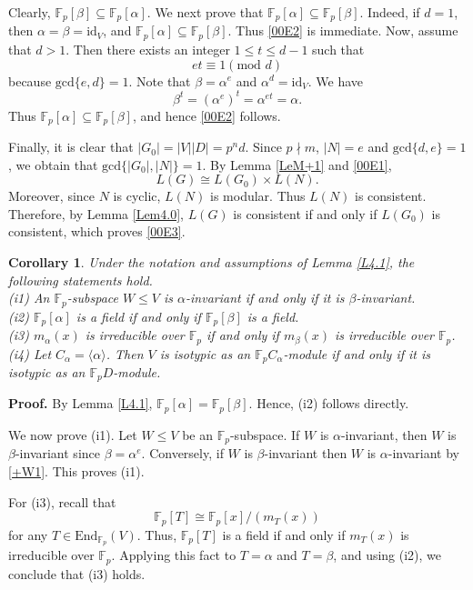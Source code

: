 \documentclass[12pt]{article}
\newtheorem{corollary}{\bf Corollary}[section]
\def\QEDopen{{\setlength{\fboxsep}{0pt}\setlength{\fboxrule}{0.2pt}\fbox{\rule[0pt]{0pt}{1.3ex}\rule[0pt]{1.3ex}{0pt}}}}
\def\QED{\QEDopen}
\def\proof{{\bf Proof.} }
\def\endproof{\hspace*{\fill}~\QED\par\endtrivlist\unskip}
\begin{document}
Clearly, $\mathbb{F}_p[\beta]\subseteq\mathbb{F}_p[\alpha]$. 
We next prove that $\mathbb{F}_p[\alpha]\subseteq\mathbb{F}_p[\beta]$. Indeed, if $d=1$, then $\alpha=\beta=\mbox{id}_V$, 
and $\mathbb{F}_p[\alpha]\subseteq\mathbb{F}_p[\beta]$. Thus \eqref{00E2} is immediate. Now, assume that $d>1$.
Then there exists an integer $1\leq t\leq d-1$ such that $$et\equiv 1 (\mbox{mod }d)$$ because $\mbox{gcd}\{e,d\}=1$. Note that $\beta=\alpha^e$ and $\alpha^d=\mbox{id}_V$. We have 
\begin{equation}\label{+W1}
\beta^t=(\alpha^{e})^t=\alpha^{et}=\alpha.    
\end{equation} 
Thus $\mathbb{F}_p[\alpha]\subseteq\mathbb{F}_p[\beta]$, and hence \eqref{00E2} follows.

Finally, it is clear that $|G_0|=|V||D|=p^nd$. Since $p\nmid m$, $|N|=e$ and $\mbox{gcd}\{d,e\}=1$, we obtain that $\mbox{gcd}\{|G_0|, |N|\}=1$. By Lemma \ref{LeM+1} and \eqref{00E1}, $$L(G)\cong L(G_0)\times L(N).$$ 
Moreover, since $N$ is cyclic, $L(N)$ is modular. Thus $L(N)$ is consistent. Therefore, by Lemma \ref{Lem4.0}, $L(G)$ is consistent if and only if $L(G_0)$ is consistent, which proves \eqref{00E3}.
\endproof 


\begin{corollary}\label{Corr4.1}
Under the notation and assumptions of Lemma \ref{L4.1}, the following statements hold.\\
(i1) An $\mathbb{F}_p$-subspace $W\leq V$ is $\alpha$-invariant if and only if it is $\beta$-invariant.\\
(i2) $\mathbb{F}_p[\alpha]$ is a field if and only if $\mathbb{F}_p[\beta]$ is a field.\\
(i3) $m_{\alpha}(x)$ is irreducible over $\mathbb{F}_p$
if and only if $m_{\beta}(x)$ is irreducible over $\mathbb{F}_p$.\\
(i4) Let $C_\alpha=\langle\alpha\rangle$. Then $V$ is
isotypic as an $\mathbb{F}_pC_\alpha$-module if and only if
it is isotypic as an $\mathbb{F}_pD$-module.
\end{corollary}
\proof 
By Lemma \ref{L4.1}, $\mathbb{F}_p[\alpha]=\mathbb{F}_p[\beta]$. Hence, (i2) follows directly. 

We now prove (i1). Let $W\leq V$ be an $\mathbb{F}_p$-subspace. If $W$ is $\alpha$-invariant, then $W$ is $\beta$-invariant since $\beta=\alpha^e$. Conversely, if $W$ is $\beta$-invariant then $W$ is $\alpha$-invariant by \eqref{+W1}. This proves (i1).
 
For (i3), recall that $$\mathbb{F}_p[T]\cong \mathbb{F}_p[x]/(m_T(x))$$
for any $T\in \mbox{End}_{\mathbb{F}_{p}}(V)$. 
Thus, $\mathbb{F}_p[T]$ is a field
if and only if $m_T(x)$ is irreducible over $\mathbb{F}_p$.
Applying this fact to $T=\alpha$ and $T=\beta$, and using (i2), we conclude that (i3) holds.
\end{document}
